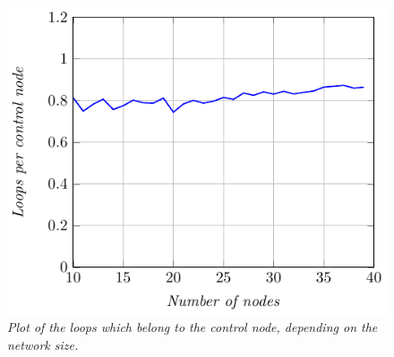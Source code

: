 \begin{figure}[H]
\centering
\includegraphics[scale=1.2]{images/controlnodes.pdf}
\caption{\emph{Plot of the loops which belong to the control node, depending on the network size.}}
\label{fig:controlnodes}
\end{figure}



